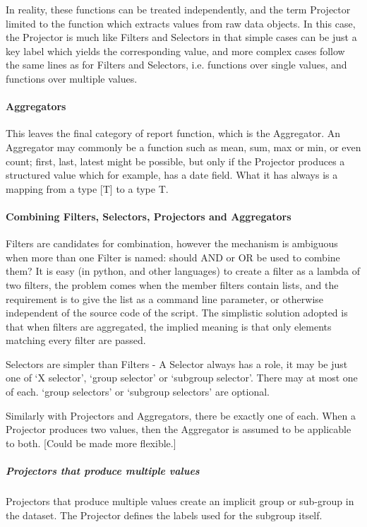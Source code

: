  In reality, these functions can be treated independently, and the term Projector limited to the function which extracts values from raw data objects.  In this case, the Projector is much like Filters and Selectors in that simple cases can be just a key label which yields the corresponding value, and more complex cases follow the same lines as for Filters and Selectors, i.e. functions over single values, and functions over multiple values.

\paragraph{Aggregators}
 This leaves the final category of report function, which is the Aggregator.  An Aggregator may commonly be a function such as mean, sum, max or min, or even count; first, last, latest might be possible, but only if the Projector produces a structured value which for example, has a date field.  What it has always is a mapping from a type [T] to a type T.

\paragraph{ Combining Filters, Selectors, Projectors and Aggregators}

 Filters are candidates for combination, however the mechanism is ambiguous when more than one Filter is named: should AND or OR be used to combine them?  It is easy (in python, and other languages) to create a filter as a lambda of two filters, the problem comes when the member filters contain lists, and the requirement is to give the list as a command line parameter, or otherwise independent of the source code of the script.  The simplistic solution adopted is that when filters are aggregated, the implied meaning is that only elements matching every filter are passed.

 Selectors are simpler than Filters - A Selector always has a role, it may be just one of `X selector', `group selector' or `subgroup selector'.  There may at most one of each.  `group selectors' or `subgroup selectors' are optional.

 Similarly with Projectors and Aggregators, there be exactly one of each.  When a Projector produces two values, then the Aggregator is assumed to be applicable to both. [Could be made more flexible.]

 
\subparagraph{Projectors that produce multiple values}
 Projectors that produce multiple values create an implicit group or sub-group in the dataset.  The Projector defines the labels used for the subgroup itself.

